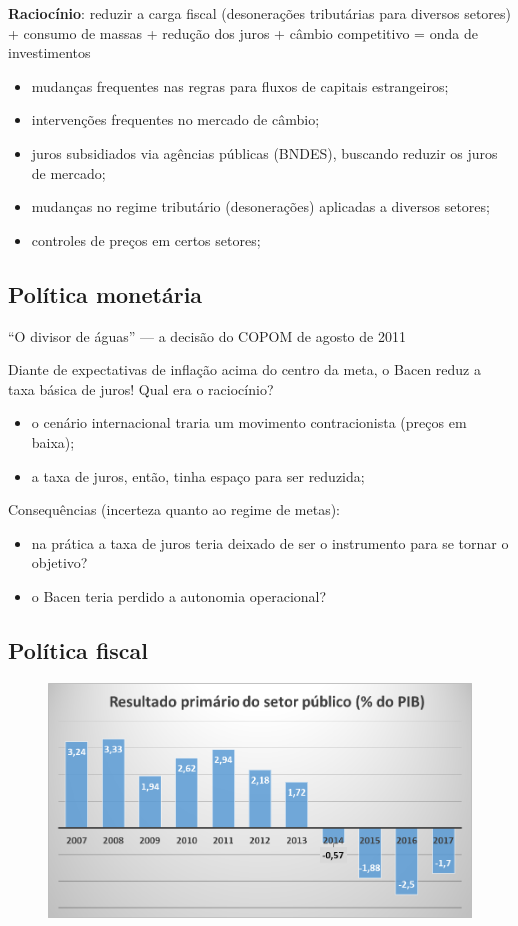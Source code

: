 \documentclass[a4paper,12pt]{article}[abntex2]
\begin{document}
\textbf{Raciocínio}: reduzir a carga fiscal (desonerações tributárias para diversos setores) + consumo de massas + redução dos juros + câmbio competitivo = onda de investimentos

\begin{itemize}
    \item mudanças frequentes nas regras para fluxos de capitais estrangeiros;
    \item intervenções frequentes no mercado de câmbio;
    \item juros subsidiados via agências públicas (BNDES), buscando reduzir os juros de mercado;
    \item mudanças no regime tributário (desonerações) aplicadas a diversos setores;
    \item controles de preços em certos setores;
\end{itemize}

\subsection{\textbf{Política monetária}}
“O divisor de águas” — a decisão do COPOM de agosto de 2011

Diante de expectativas de inflação acima do centro da meta, o Bacen reduz a taxa básica de juros! Qual era o raciocínio?

\begin{itemize}
    \item o cenário internacional traria um movimento contracionista (preços em baixa);
    \item a taxa de juros, então, tinha espaço para ser reduzida;
\end{itemize}

Consequências (incerteza quanto ao regime de metas):

\begin{itemize}
    \item na prática a taxa de juros teria deixado de ser o instrumento para se tornar o objetivo?
    \item o Bacen teria perdido a autonomia operacional?
\end{itemize}


\subsection{\textbf{Política fiscal}}
\begin{figure}[H]
    \centering
    \includegraphics[width=0.7\linewidth]{Imagens/a18i1.png}
\end{figure}
\end{document}
